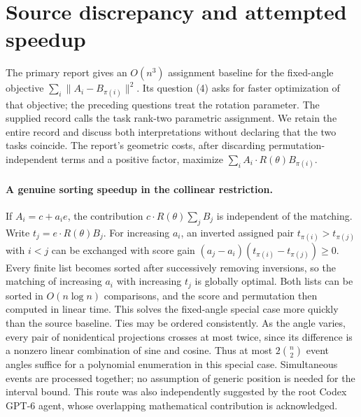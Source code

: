 \documentclass[11pt]{article}
\begin{document}
\section{Source discrepancy and attempted speedup}
The primary report gives an $O(n^3)$ assignment baseline for the fixed-angle
objective $\sum_i\|A_i-B_{\pi(i)}\|^2$. Its question (4) asks for faster
optimization of that objective; the preceding questions treat the rotation
parameter. The supplied record calls the task rank-two parametric assignment.
We retain the entire record and discuss both interpretations without declaring
that the two tasks coincide. The report's geometric costs, after discarding
permutation-independent terms and a positive factor, maximize
$\sum_i A_i\cdot R(\theta)B_{\pi(i)}$.

\paragraph{A genuine sorting speedup in the collinear restriction.}
If $A_i=c+a_i e$, the contribution $c\cdot R(\theta)\sum_jB_j$ is
independent of the matching. Write $t_j=e\cdot R(\theta)B_j$.
For increasing $a_i$, an inverted assigned pair $t_{\pi(i)}>t_{\pi(j)}$
with $i<j$ can be exchanged with score gain
$(a_j-a_i)(t_{\pi(i)}-t_{\pi(j)})\ge0$.
Every finite list becomes sorted after successively removing inversions, so
the matching of increasing $a_i$ with increasing $t_j$ is globally optimal.
Both lists can be sorted in $O(n\log n)$ comparisons, and the score and
permutation then computed in linear time. This solves the fixed-angle special
case more quickly than the source baseline. Ties may be ordered consistently.
As the angle varies, every pair of nonidentical projections crosses at most
twice, since its difference is a nonzero linear combination of sine and cosine.
Thus at most $2\binom n2$ event angles suffice for a polynomial enumeration
in this special case. Simultaneous events are processed together; no assumption
of generic position is needed for the interval bound. This route was also
independently suggested by the root Codex GPT-6 agent, whose overlapping
mathematical contribution is acknowledged.
\end{document}
